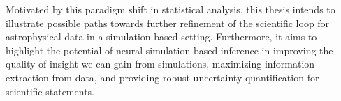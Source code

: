 Motivated by this paradigm shift in statistical analysis, this thesis intends to illustrate possible paths towards further refinement of the scientific loop for astrophysical data in a simulation-based setting. Furthermore, it aims to highlight the potential of neural simulation-based inference in improving the quality of insight we can gain from simulations, maximizing information extraction from data, and providing robust uncertainty quantification for scientific statements.


%
%

